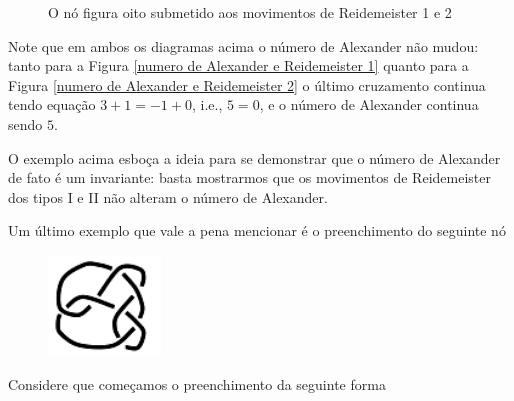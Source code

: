 	\begin{figure}[H]
        \centering
        \hfill
        \caption{O nó figura oito submetido aos movimentos de Reidemeister 1 e 2}
    \end{figure}
	\par\vspace{0.3cm} Note que em ambos os diagramas acima o número de Alexander não mudou: tanto para a Figura \ref{numero de Alexander e Reidemeister 1} quanto para a Figura \ref{numero de Alexander e Reidemeister 2} o último cruzamento continua tendo equação $3+1=-1+0$, i.e., $5=0$, e o número de Alexander continua sendo $5$.
	\par\vspace{0.3cm} O exemplo acima esboça a ideia para se demonstrar que o número de Alexander de fato é um invariante: basta mostrarmos que os movimentos de Reidemeister dos tipos I e II não alteram o número de Alexander.
	\par\vspace{0.3cm} Um último exemplo que vale a pena mencionar é o preenchimento do seguinte nó
	\begin{figure}[H]
		\begin{center}
			\includegraphics[width=3cm]{Images/no_exemplo_travado.png}
		\end{center}
	\end{figure}
	\par\vspace{0.3cm} Considere que começamos o preenchimento da seguinte forma
